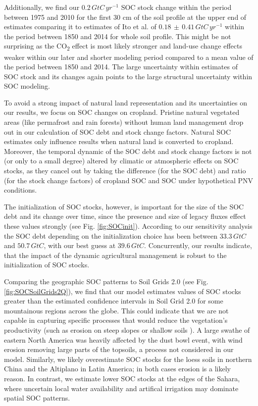 \documentclass[gc, manuscript]{copernicus}
\begin{document}
Additionally, we find our \(0.2\,\unit{GtC\,yr^{-1}}\) SOC stock change within the period between 1975 and 2010 for the first 30 cm of the soil profile at the upper end of estimates comparing it to estimates of Ito et al. \citeyearpar{ito_soil_2020} of \(0.18\,\pm\,0.41\,\unit{GtC\,yr^{-1}}\) within the period between 1850 and 2014 for whole soil profile. This might be not surprising as the CO\textsubscript{2} effect is most likely stronger and land-use change effects weaker within our later and shorter modeling period compared to a mean value of the period between 1850 and 2014.
The large uncertainty within estimates of SOC stock and its changes \citep{ito_soil_2020} again points to the large structural uncertainty within SOC modeling.

To avoid a strong impact of natural land representation and its uncertainties on our results, we focus on SOC changes on cropland. Pristine natural vegetated areas (like permafrost and rain forests) without human land management drop out in our calculation of SOC debt and stock change factors. Natural SOC estimates only influence results when natural land is converted to cropland. Moreover, the temporal dynamic of the SOC debt and stock change factors is not (or only to a small degree) altered by climatic or atmospheric effects on SOC stocks, as they cancel out by taking the difference (for the SOC debt) and ratio (for the stock change factors) of cropland SOC and SOC under hypothetical PNV conditions.

The initialization of SOC stocks, however, is important for the size of the SOC debt and its change over time, since the presence and size of legacy fluxes effect these values strongly (see Fig. \ref{fig:SOCinit}). According to our sensitivity analysis the SOC debt depending on the initialization choice has been between \(33.3\,\unit{GtC}\) and \(50.7\,\unit{GtC}\), with our best guess at \(39.6\,\unit{GtC}\). Concurrently, our results indicate, that the impact of the dynamic agricultural management is robust to the initialization of SOC stocks.

Comparing the geographic SOC patterns to Soil Grids 2.0 \citep{poggio_soilgrids_2021} (see Fig. \ref{fig:SOCSoilGrids2Q}), we find that our model estimates values of SOC stocks greater than the estimated confidence intervals in Soil Grid 2.0 for some mountainous regions across the globe. This could indicate that we are not capable in capturing specific processes that would reduce the vegetation's productivity (such as erosion on steep slopes or shallow soils \citep{borrelli_assessment_2017}). A large swathe of eastern North America was heavily affected by the dust bowl event, with wind erosion removing large parts of the topsoils, a process not considered in our model. Similarly, we likely overestimate SOC stocks for the loess soils in northern China and the Altiplano in Latin America; in both cases erosion is a likely reason. In contrast, we estimate lower SOC stocks at the edges of the Sahara, where uncertain local water availability and artifical irrigation may dominate spatial SOC patterns.
\end{document}
